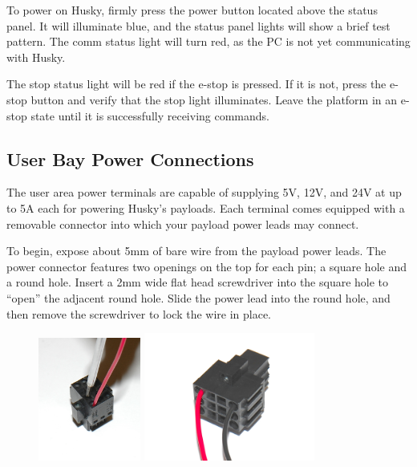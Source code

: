 \documentclass[]{clearpath-latex/clearpath-manual}
\begin{document}
To power on Husky, firmly press the power button located above the status panel. It will illuminate blue, and the 
status panel lights will show a brief test pattern. The comm status light will turn red, as the PC is not yet 
communicating with Husky.

The stop status light will be red if the e-stop is pressed. If it is not, press the e-stop button and 
verify that the stop light illuminates. Leave the platform in an e-stop state until it is successfully receiving commands.

\subsection{User Bay Power Connections}
The user area power terminals are capable of supplying 5V, 12V, and 24V at up to 5A each for powering Husky’s payloads.  
Each terminal comes equipped with a removable connector into which your payload power leads may connect.

To begin, expose about 5mm of bare wire from the payload power leads. The power connector features two 
openings on the top for each pin; a square hole and a round hole. Insert a 2mm wide flat head screwdriver 
into the square hole to “open” the adjacent round hole. Slide the power lead into the round hole, and then 
remove the screwdriver to lock the wire in place.

\begin{figure}[h]
	\centering
	\includegraphics[width=0.3\textwidth]{power-connector-1.png}
	\includegraphics[width=0.5\textwidth]{power-connector-2.png}
\end{figure}
\end{document}
